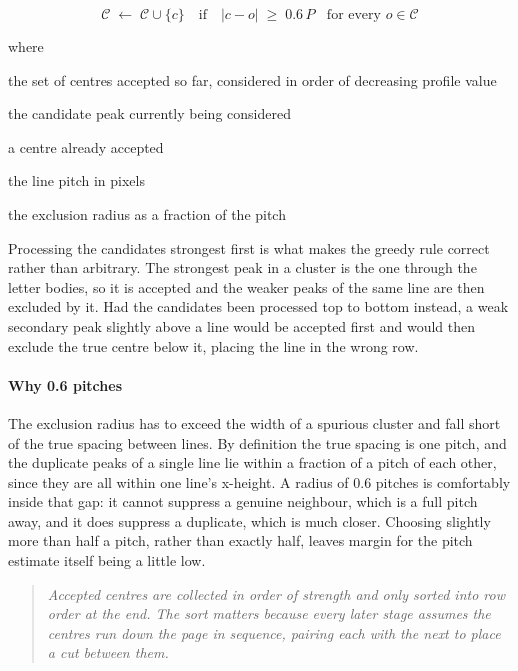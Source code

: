 \begin{equation}
\mathcal{C} \;\leftarrow\; \mathcal{C} \cup \{c\} \quad\text{if}\quad |c - o| \;\ge\; 0.6\,P \;\;\text{ for every } o \in \mathcal{C}
\end{equation}

\noindent where
\begin{description}[leftmargin=2.4em,style=nextline,font=\normalfont\ttfamily]\setlength\itemsep{1pt}
  \item[{$\mathcal{C}$}] \normalfont the set of centres accepted so far, considered in order of decreasing profile value
  \item[{$c$}] \normalfont the candidate peak currently being considered
  \item[{$o$}] \normalfont a centre already accepted
  \item[{$P$}] \normalfont the line pitch in pixels
  \item[{$0.6$}] \normalfont the exclusion radius as a fraction of the pitch
\end{description}
Processing the candidates strongest first is what makes the greedy rule correct rather than arbitrary. The strongest peak in a cluster is the one through the letter bodies, so it is accepted and the weaker peaks of the same line are then excluded by it. Had the candidates been processed top to bottom instead, a weak secondary peak slightly above a line would be accepted first and would then exclude the true centre below it, placing the line in the wrong row.


\paragraph{Why 0.6 pitches}
The exclusion radius has to exceed the width of a spurious cluster and fall short of the true spacing between lines. By definition the true spacing is one pitch, and the duplicate peaks of a single line lie within a fraction of a pitch of each other, since they are all within one line's x-height. A radius of 0.6 pitches is comfortably inside that gap: it cannot suppress a genuine neighbour, which is a full pitch away, and it does suppress a duplicate, which is much closer. Choosing slightly more than half a pitch, rather than exactly half, leaves margin for the pitch estimate itself being a little low.


\begin{quote}\small\itshape Accepted centres are collected in order of strength and only sorted into row order at the end. The sort matters because every later stage assumes the centres run down the page in sequence, pairing each with the next to place a cut between them.\end{quote}

